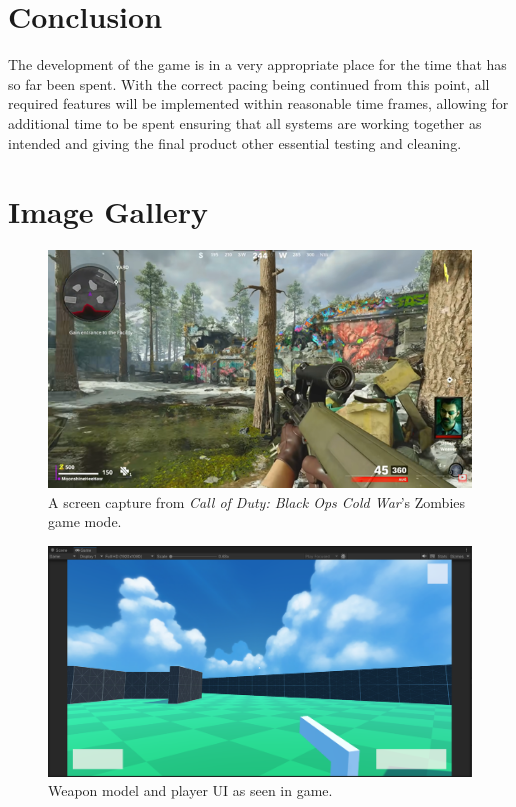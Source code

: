 \documentclass[11pt]{article}
\begin{document}
\section{Conclusion}
The development of the game is in a very appropriate place for the time that has so far been spent.
With the correct pacing being continued from this point, all required features will be implemented
within reasonable time frames, allowing for additional time to be spent ensuring that all systems
are working together as intended and giving the final product other essential testing and
cleaning. \\

\clearpage


\appendix

\section{Image Gallery}
\begin{figure}[htb] 
    \centering
    \includegraphics[width=\columnwidth]{inspo}
    \caption{A screen capture from \textit{Call of Duty: Black Ops Cold War}'s Zombies game mode.}
    \label{fig:inspo}
\end{figure}

\begin{figure}[htb] 
    \centering
    \includegraphics[width=\columnwidth]{weapon}
    \caption{Weapon model and player UI as seen in game.}
    \label{fig:weapon}
\end{figure}
\end{document}
